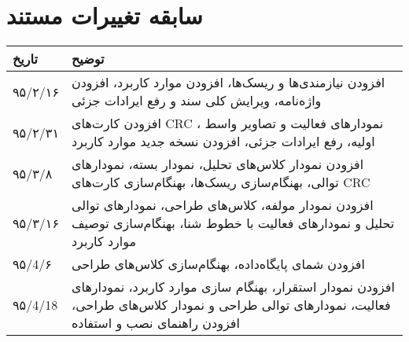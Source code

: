 
\chapter{سابقه تغییرات مستند}

\begin{table}[H]
	\centering
	\begin{tabular}{|p{3cm}|p{5cm}|}
		\hline
		تاریخ & توضیح \\
		\hline
		
		۹۵/۲/۱۶  & افزودن نیازمندی‌ها و ریسک‌ها، افزودن موارد کاربرد، افزودن واژه‌نامه، ویرایش کلی سند و رفع ایرادات جزئی \\
		۹۵/۲/۳۱  & افزودن کارت‌های CRC ، نمودارهای فعالیت و تصاویر واسط اولیه، رفع ایرادات جزئی، افزودن نسخه جدید موارد کاربرد \\
		۹۵/۳/۸  & افزودن نمودار کلاس‌های تحلیل، نمودار بسته، نمودارهای توالی، بهنگام‌سازی ریسک‌ها، بهنگام‌سازی کارت‌های CRC \\
		۹۵/۳/۱۶  & افزودن نمودار مولفه، کلاس‌های طراحی، نمودارهای توالی تحلیل و نمودارهای فعالیت با خطوط شنا، بهنگام‌سازی توصیف موارد کاربرد \\
		۹۵/4/۶  & افزودن شمای پایگاه‌داده، بهنگام‌سازی کلاس‌های طراحی \\
		۹۵/4/18  & افزودن نمودار استقرار، بهنگام سازی موارد کاربرد، نمودارهای فعالیت، نمودارهای توالی طراحی و نمودار کلاس‌های طراحی، افزودن راهنمای نصب و استفاده \\
		
		\hline
	\end{tabular}
\end{table}

